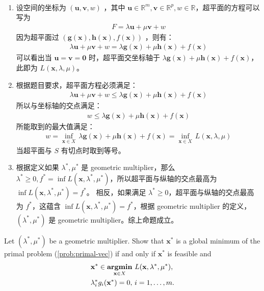 \documentclass[11pt,letter,notitlepage]{article}
\DeclareMathOperator*{\argmin}{\bf argmin}
\begin{document}
\newpage
${}$
\begin{solution}
	\heiti
	\begin{enumerate}
		\ \\
		\item 设空间的坐标为 $(\textbf{u}, \textbf{v}, w)$ ，其中 $\textbf{u} \in \mathbb{R}^m, \textbf{v} \in \mathbb{R}^p, w \in \mathbb{R}$，超平面的方程可以写为
		\begin{align*}
			F = \lambda \textbf{u} + \mu \textbf{v} + w
		\end{align*}
		因为超平面过 $(\mathbf{g}(\mathbf{x}),\mathbf{h}(\mathbf{x}),f(\mathbf{x}))$ ，则有：
		\begin{align*}
			\lambda \textbf{u} + \mu \textbf{v} + w = \lambda \mathbf{g}(\mathbf{x}) + \mu \mathbf{h}(\mathbf{x}) + f(\mathbf{x})
		\end{align*}
		可以看出当 $\textbf{u} = \textbf{v} = \textbf{0}$ 时，超平面交坐标轴于 $\lambda \mathbf{g}(\mathbf{x}) + \mu \mathbf{h}(\mathbf{x}) + f(\mathbf{x})$，此即为 $L(\mathbf{x},\lambda,\mu)$。
		\item 根据题目要求，超平面方程必须满足：
		\begin{align*}
			\lambda \textbf{u} + \mu \textbf{v} + w \leqslant \lambda \mathbf{g}(\mathbf{x}) + \mu \mathbf{h}(\mathbf{x}) + f(\mathbf{x})
		\end{align*}
		所以与坐标轴的交点满足：
		\begin{align*}
			w \leqslant \lambda \mathbf{g}(\mathbf{x}) + \mu \mathbf{h}(\mathbf{x}) + f(\mathbf{x})
		\end{align*}
		所能取到的最大值满足：
		\begin{align*}
			w = \inf_{\mathbf{x}\in X}\, \lambda \mathbf{g}(\mathbf{x}) + \mu \mathbf{h}(\mathbf{x}) + f(\mathbf{x}) = \inf_{\mathbf{x}\in X}\,L(\mathbf{x},\lambda,\mu)
		\end{align*}
		当超平面与 $S$ 有切点时取到等号。
		\item 根据定义如果 $\lambda^*, \mu^*$ 是 geometric multiplier，那么 $\lambda^* \geqslant 0, f^* = \inf L(\mathbf{x}, \lambda^*, \mu^*)$，所以超平面与纵轴的交点最高为 $\inf L(\mathbf{x}, \lambda^*,\mu^*) = f^*$。
		相反，如果满足 $\lambda^* \geqslant 0$，超平面与纵轴的交点最高为 $f^*$，这蕴含 $\inf L(\mathbf{x}, \lambda^*, \mu^*) = f^*$，根据 geometric multiplier 的定义，$(\lambda^*,\mu^*)$ 是 geometric multiplier。综上命题成立。
	\end{enumerate}
\end{solution}

\newpage
\begin{exercise}
Let $(\lambda^*,\mu^*)$ be a geometric multiplier. Show that $\mathbf{x}^*$ is a global minimum of the primal problem (\ref{prob:primal-vec}) if and only if $\mathbf{x}^*$ is feasible and 
\begin{align*}
	&\mathbf{x}^*\in\argmin_{\mathbf{x}\in X}\,L(\mathbf{x},\lambda^*,\mu^*),\\
	&\lambda_i^*g_i(\mathbf{x}^*)=0,\,i=1,\ldots,m.
\end{align*}
\end{exercise}
\end{document}
